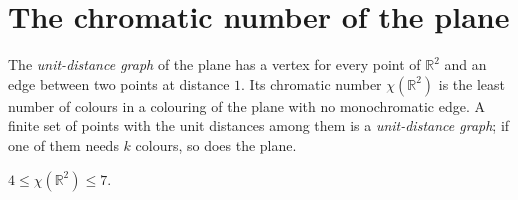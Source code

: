 \section{The chromatic number of the plane}

The \emph{unit-distance graph} of the plane has a vertex for every point of $\mathbb R^2$ and an edge between two points at distance $1$. Its chromatic
number $\chi(\mathbb R^2)$ is the least number of colours in a colouring of the plane with no monochromatic edge. A finite set of points with the unit
distances among them is a \emph{unit-distance graph}; if one of them needs $k$ colours, so does the plane.

\begin{theorem}\label{thm:hn}
$4\le\chi(\mathbb R^2)\le7$.
\end{theorem}
